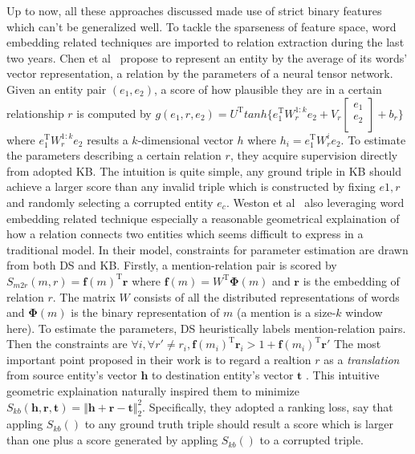 \documentclass[10pt]{article} %
\theoremstyle{definition}
\theoremstyle{definition}
\begin{document}
Up to now, all these approaches discussed made use of strict binary features which can't be generalized well. 
To tackle the sparseness of feature space, word embedding related techniques are imported to relation extraction during the last two years. 
Chen et al~\cite{cdq} propose to represent an entity by the average of its words' vector representation, a relation by the parameters of a neural tensor network. 
Given an entity pair $(e_1, e_2)$, a score of how plausible they are in a certain relationship $r$ is computed by 
$g(e_1, r, e_2)=U^{\mathrm{T}}tanh\{e_{1}^{\mathrm{T}}W_{r}^{1:k}e_2+V_{r}\begin{bmatrix}e_1\\e_2\\\end{bmatrix}+b_{r}\}$ where 
$e_{1}^{\mathrm{T}}W_{r}^{1:k}e_{2}$ results a $k$-dimensional vector $h$ where 
$h_{i}=e_{1}^{\mathrm{T}}W_{r}^{i}e_2$. 
To estimate the parameters describing a certain relation $r$, they acquire supervision directly from adopted KB. 
The intuition is quite simple, any ground triple in KB should achieve a larger score than any invalid triple which 
is constructed by fixing $e1, r$ and randomly selecting a corrupted entity $e_c$. 
Weston et al~\cite{embedding} also leveraging word embedding related technique especially a reasonable geometrical explaination of how a relation connects two entities
which seems difficult to express in a traditional model. 
In their model, constraints for parameter estimation are drawn from both DS and KB. 
Firstly, a mention-relation pair is scored by $S_{m2r}(m, r)=\mathbf{f}(m)^{\mathrm{T}}\mathbf{r}$ where 
$\mathbf{f}(m)=W^{\mathrm{T}}\boldsymbol{\Phi}(m)$ and $\mathbf{r}$ is the embedding of relation $r$. 
The matrix $W$ consists of all the distributed representations of words and $\boldsymbol{\Phi}(m)$ is 
the binary representation of $m$ (a mention is a size-$k$ window here). 
To estimate the parameters, DS heuristically labels mention-relation pairs. 
Then the constraints are $\forall i, \forall r'\neq r_i, \mathbf{f}(m_i)^{\mathrm{T}}\mathbf{r}_i > 1+\mathbf{f}(m_i)^{\mathrm{T}}\mathbf{r}'$
The most important point proposed in their work is to regard a realtion $r$ as a \emph{translation} from source entity's vector $\mathbf{h}$ to destination entity's vector $\mathbf{t}$ .
This intuitive geometric explaination naturally inspired them to minimize 
$S_{kb}(\mathbf{h},\mathbf{r},\mathbf{t})=\Vert \mathbf{h}+\mathbf{r}-\mathbf{t} \Vert_{2}^{2}$. 
Specifically, they adopted a ranking loss, say that appling $S_{kb}()$ to any ground truth triple should result a score 
which is larger than one plus a score generated by appling $S_{kb}()$ to a corrupted triple. 
\end{document}
